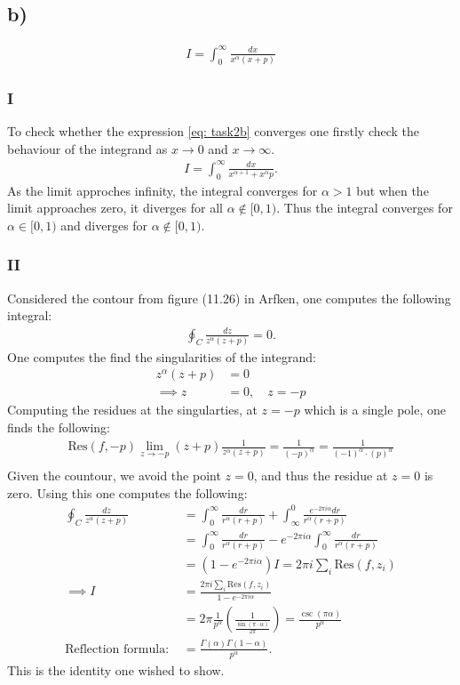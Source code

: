 \documentclass{article}
\newcommand{\res}[2]{\text{Res}(#1,#2)}
\begin{document}
\subsection*{b)}
\begin{align}
    I = \int_0^\infty \frac{dx}{x^\alpha(x + p)}\label{eq: task2b}
\end{align}
\subsubsection*{I}
To check whether the expression \eqref{eq: task2b} converges one firstly check the behaviour of the integrand as $x\rightarrow 0$ and $x\rightarrow \infty$.
\begin{align*}
    I =\int_0^\infty \frac{dx}{x^{\alpha + 1} + x^{\alpha}p}.
\end{align*}As the limit approches infinity, the integral converges for $\alpha>1$ but when the limit approaches zero, it diverges for all $\alpha\notin[0, 1)$.
Thus the integral converges for $\alpha\in[0, 1)$ and diverges for $\alpha\notin[0, 1)$.

\subsubsection*{II}
Considered the contour from figure (11.26) in Arfken, one computes the following integral:
\begin{align*}
    \oint_C \frac{dz}{z^\alpha(z + p)} = 0.
\end{align*}One computes the find the singularities of the integrand:
\begin{align*}
    z^\alpha(z + p) &= 0\\
    \implies z &= 0, \quad z = -p
\end{align*}
Computing the residues at the singularties, at $z = -p$ which is a single pole, one finds the following: 
\begin{align*}
    \res{f}{-p}\lim_{z\to -p} (z+p)\frac{1}{z^\alpha(z + p)} = \frac{1}{(-p)^{\alpha}} = \frac{1}{(-1)^\alpha\cdot(p)^\alpha}\\
\end{align*}
Given the countour, we avoid the point $z = 0$, and thus the residue at $z = 0$ is zero. Using this one computes the following:
\begin{align*}
    \oint_C \frac{dz}{z^\alpha(z + p)} &= \int_0^\infty \frac{dr}{r^\alpha(r + p)} + \int_{\infty}^0\frac{e^{-2\pi i \alpha}dr}{r^\alpha(r + p)} \\
    &= \int_0^\infty \frac{dr}{r^\alpha(r + p)} - e^{-2\pi i \alpha}\int_{0}^\infty\frac{dr}{r^\alpha(r + p)} \\
    &= (1-e^{-2\pi i \alpha})I = 2\pi i\sum_i \res{f}{z_i}\\
    \implies I&= \frac{2\pi i\sum_i\res{f}{z_i}}{1-e^{-2\pi i \alpha}}\\
    &=2\pi\frac{1}{p^{\alpha}}\left(\frac{1}{\frac{\sin(\pi \cdot\alpha)}{2\pi}}\right) = \frac{\csc(\pi \alpha)}{p^\alpha}\\
    \text{Reflection formula: }&= \frac{\Gamma(\alpha)\Gamma(1-\alpha)}{p^\alpha}.
\end{align*}This is the identity one wished to show.
\end{document}
